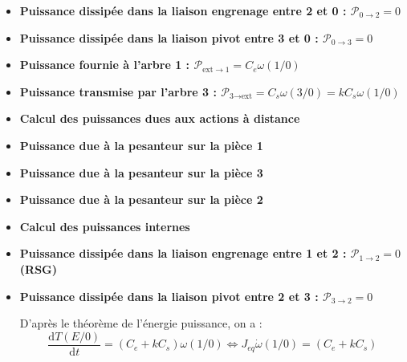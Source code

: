 \documentclass[10pt,fleqn]{article} %
\begin{document}
\begin{multicols}{2}
\begin{corrige}
\begin{itemize}
\item \textbf{Puissance dissipée dans la liaison engrenage entre 2 et 0 : $\mathcal{P}_{0\rightarrow 2}=0$ } 
\item \textbf{Puissance dissipée dans la liaison pivot entre 3 et 0 : $\mathcal{P}_{0\rightarrow 3}=0$ } 
\item \textbf{Puissance fournie à l'arbre 1 : $\mathcal{P}_{\text{ext} \rightarrow 1} = C_e \omega(1/0)$} 
\item \textbf{Puissance transmise par l'arbre 3 : $\mathcal{P}_{\text{3} \rightarrow \text{ext}} = C_s \omega(3/0) = k C_s \omega(1/0) $} 
\item \textbf{Calcul des puissances dues aux actions à distance}

\item \textbf{Puissance due à la pesanteur sur la pièce 1}

\item \textbf{Puissance due à la pesanteur sur la pièce 3}

\item \textbf{Puissance due à la pesanteur sur la pièce 2}

\item \textbf{Calcul des puissances internes}

\item \textbf{Puissance dissipée dans la liaison engrenage entre 1 et 2 : $\mathcal{P}_{1\rightarrow 2} = 0$ (RSG)} 


\item \textbf{Puissance dissipée dans la liaison pivot entre 2 et 3 : $\mathcal{P}_{3\rightarrow 2} = 0$}

D'après le théorème de l'énergie puissance, on a : 
$$
\dfrac{\text{d}T\left(E/0\right)}{\text{d}t} = \left( C_e + kC_s\right)\omega(1/0)
\Leftrightarrow
J_{eq}\dot{\omega}(1/0) = \left( C_e + kC_s\right)
$$
\end{itemize} 
\end{corrige}

\else
\fi


\ifprof
\else
\end{multicols}
\fi
\end{document}
